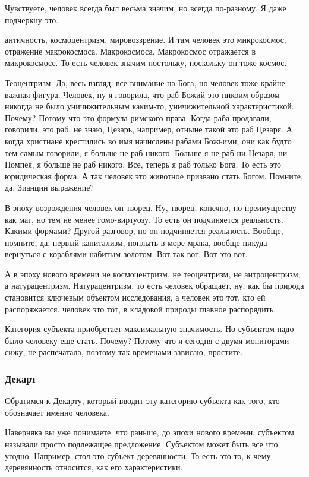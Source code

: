 Чувствуете, человек всегда был весьма значим, но всегда по-разному. Я даже
подчеркну это. 

античность, космоцентризм, мировоззрение. И там человек
это микрокосмос, отражение макрокосмоса. Макрокосмоса. Макрокосмос отражается в
микрокосмосе. То есть человек значим постольку, поскольку он тоже космос.

Теоцентризм. Да, весь взгляд, все внимание на Бога, но человек тоже крайне
важная фигура. Человек, ну я говорила, что раб Божий это никоим образом никогда
не было уничижительным каким-то, уничижительной характеристикой. Почему? Потому
что это формула римского права. Когда раба продавали, говорили, это раб, не
знаю, Цезарь, например, отныне такой это раб Цезаря. А когда христиане
крестились во имя начислены рабами Божьими, они как будто тем самым говорили, я
больше не раб никого. Больше я не раб ни Цезаря, ни Помпея, я больше не раб
никого. Все, теперь я раб только Бога. То есть это юридическая форма. А так
человек это животное призвано стать Богом. Помните, да, Зианцин выражение? 

В
эпоху возрождения человек он творец. Ну, творец, конечно, по преимуществу как
маг, но тем не менее гомо-виртуозу. То есть он подчиняется реальность. Какими
формами? Другой разговор, но он подчиняется реальность. Вообще, помните, да,
первый капитализм, поплыть в море мрака, вообще никуда вернуться с кораблями
набитым золотом. Вот так вот. Вот это вот. 

А в эпоху нового времени не
космоцентризм, не теоцентризм, не антроцентризм, а натурацентризм.
Натурацентризм, то есть человек обращает, ну, как бы природа становится ключевым
объектом исследования, а человек это тот, кто ей распоряжается. человек это тот,
в кладовой природы главное распорядить. 

Категория субъекта приобретает максимальную значимость.  
Но субъектом надо было человеку еще стать. Почему? Потому что я сегодня с двумя
мониторами сижу, не распечатала, поэтому так временами зависаю, простите. 

\subsubsection{Декарт}
Обратимся к Декарту, который вводит эту категорию субъекта как того, кто обозначает именно человека. 

Наверняка вы уже
понимаете, что раньше, до эпохи нового времени, субъектом называли просто
подлежащее предложение. Субъектом может быть все что угодно. Например, стол это
субъект деревянности. То есть это то, к чему
деревянность относится, как его характеристики. 

